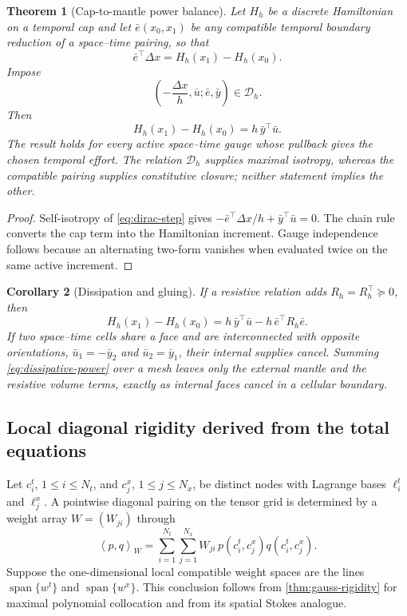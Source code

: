 \documentclass[11pt,a4paper]{article}
\newtheorem{theorem}{Theorem}[section]
\newtheorem{corollary}[theorem]{Corollary}
\newcommand{\cD}{\mathcal D}
\newcommand{\ip}[2]{\left\langle #1,#2\right\rangle}
\newcommand{\Span}{\operatorname{span}}
\begin{document}
\begin{theorem}[Cap-to-mantle power balance]
\label{thm:space-time-step}
Let \(H_h\) be a discrete Hamiltonian on a temporal cap and let
\(\bar e(x_0,x_1)\) be any compatible temporal boundary reduction of a
space--time pairing, so that
\[
 \bar e^\top\Delta x=H_h(x_1)-H_h(x_0).
\]
Impose
\begin{equation}\label{eq:dirac-step}
 \left(-\frac{\Delta x}{h},\bar u;\bar e,\bar y\right)\in\cD_h.
\end{equation}
Then
\begin{equation}\label{eq:dirac-power}
 H_h(x_1)-H_h(x_0)=h\,\bar y^\top\bar u.
\end{equation}
The result holds for every active space--time gauge whose pullback gives
the chosen temporal effort.  The relation \(\cD_h\) supplies maximal
isotropy, whereas the compatible pairing supplies constitutive closure;
neither statement implies the other.
\end{theorem}

\begin{proof}
Self-isotropy of \cref{eq:dirac-step} gives
\(
 -\bar e^\top\Delta x/h+\bar y^\top\bar u=0
\).
The chain rule converts the cap term into the Hamiltonian increment.
Gauge independence follows because an alternating two-form vanishes when
evaluated twice on the same active increment.
\end{proof}

\begin{corollary}[Dissipation and gluing]
\label{cor:composition}
If a resistive relation adds \(R_h=R_h^\top\succeq0\), then
\begin{equation}\label{eq:dissipative-power}
 H_h(x_1)-H_h(x_0)
 =h\,\bar y^\top\bar u-h\,\bar e^\top R_h\bar e.
\end{equation}
If two space--time cells share a face and are interconnected with opposite
orientations,
\(\bar u_1=-\bar y_2\) and \(\bar u_2=\bar y_1\), their internal supplies
cancel.  Summing \cref{eq:dissipative-power} over a mesh leaves only the
external mantle and the resistive volume terms, exactly as internal faces
cancel in a cellular boundary.
\end{corollary}

\subsection{Local diagonal rigidity derived from the total equations}

Let \(c_i^t\), \(1\le i\le N_t\), and
\(c_j^x\), \(1\le j\le N_x\), be distinct nodes with Lagrange bases
\(\ell_i^t\) and \(\ell_j^x\).  A pointwise diagonal pairing on the tensor
grid is determined by a weight array \(W=(W_{ji})\) through
\begin{equation}\label{eq:local-tensor-pairing}
 \ip{p}{q}_W
 =\sum_{i=1}^{N_t}\sum_{j=1}^{N_x}
 W_{ji}\,p(c_i^t,c_j^x)q(c_i^t,c_j^x).
\end{equation}
Suppose the one-dimensional local compatible weight spaces are the lines
\(\Span\{w^t\}\) and \(\Span\{w^x\}\).  This conclusion follows from
\cref{thm:gauss-rigidity} for maximal polynomial collocation and from its
spatial Stokes analogue.
\end{document}
